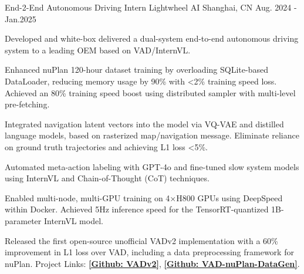 \begin{cventries}
  \begin{cventry}
      {End-2-End Autonomous Driving Intern}
      {Lightwheel AI}
      {Shanghai, CN}
      {Aug. 2024 - Jan.2025}
      {
        \begin{cvitems}
            \item{Developed and white-box delivered a dual-system end-to-end autonomous driving system to a leading OEM based on VAD/InternVL.}
            \item{Enhanced nuPlan 120-hour dataset training by overloading SQLite-based DataLoader, reducing memory usage by 90\% with <2\% training speed loss. Achieved an 80\% training speed boost using distributed sampler with multi-level pre-fetching.}
            \item{Integrated navigation latent vectors into the model via VQ-VAE and distilled language models, based on rasterized map/navigation message. Eliminate reliance on ground truth trajectories and achieving L1 loss <5\%.}
            \item{Automated meta-action labeling with GPT-4o and fine-tuned slow system models using InternVL and Chain-of-Thought (CoT) techniques.}
            \item{Enabled multi-node, multi-GPU training on 4×H800 GPUs using DeepSpeed within Docker. Achieved 5Hz inference speed for the TensorRT-quantized 1B-parameter InternVL model.}
            \item{Released the first open-source unofficial VADv2 implementation with a 60\% improvement in L1 loss over VAD, including a data preprocessing framework for nuPlan. Project Links: \href{https://github.com/priest-yang/VADv2}{\textbf{[Github: VADv2]}}, \href{https://github.com/priest-yang/Nuplan-VAD-DataGen}{\textbf{[Github: VAD-nuPlan-DataGen]}}.}
        \end{cvitems}
      }
  \end{cventry}





\end{cventries}
